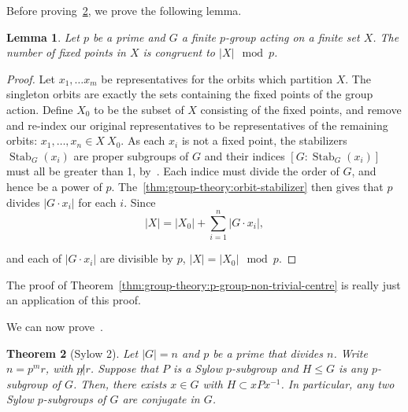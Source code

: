 \documentclass[12pt]{report}
\newenvironment{bluebox}{\begin{tcolorbox}[colback=blue!5!white,colframe=blue!75!black]}{\end{tcolorbox}}
\newcommand{\Stab}{\operatorname{Stab}}
\newtheorem{theorem}{Theorem}[section] %
\newtheorem{lemma}[theorem]{Lemma}
\theoremstyle{definition}
\newenvironment{note}{\begin{bluebox}}{\end{bluebox}}
\begin{document}
Before proving~\ref{thm:group-theory:Sylow-2}, we prove the following lemma.

\begin{lemma}\label{lem:group-theory:fixed-points-p-group-action}
  Let \(p\) be a prime and \(G\) a finite \(p\)-group acting on a finite set \(X\). The number of fixed points in \(X\) is congruent to \(|X| \mod p\).
\end{lemma}

\begin{proof}
  Let \(x_{1}, \ldots x_{m}\) be representatives for the orbits which partition \(X\). The singleton orbits are exactly the sets containing the fixed points of the group action. Define \(X_{0}\) to be the subset of \(X\) consisting of the fixed points, and remove and re-index our original representatives to be representatives of the remaining orbits: \(x_{1}, \ldots, x_{n} \in X \ X_{0}\). As each \(x_{i}\) is not a fixed point, the stabilizers \(\Stab_{G}(x_{i})\) are proper subgroups of \(G\) and their indices \([G : \Stab_{G}(x_{i})]\) must all be greater than 1, by~. Each indice must divide the order of \(G\), and hence be a power of \(p\). The~\ref{thm:group-theory:orbit-stabilizer} then gives that \(p\) divides \(|G \cdot x_{i}|\) for each \(i\). Since
  \[|X| = |X_{0}| + \sum_{i=1}^{n} |G \cdot x_{i}|,\]

  and each of \(|G \cdot x_{i}|\) are divisible by \(p\), \(|X| = |X_{0}| \mod p\).
\end{proof}

\begin{note}
  The proof of Theorem~\ref{thm:group-theory:p-group-non-trivial-centre} is really just an application of this proof.
\end{note}

We can now prove~.

\begin{theorem}[Sylow 2]\label{thm:group-theory:Sylow-2}
  Let \(|G| = n\) and \(p\) be a prime that divides \(n\). Write \(n = p^{m}r\), with \(p \not| r\). Suppose that \(P\) is a Sylow \(p\)-subgroup and \(H \leq G\) is any \(p\)-subgroup of \(G\). Then, there exists \(x \in G\) with \(H \subset xPx^{-1}\). In particular, any two Sylow \(p\)-subgroups of \(G\) are conjugate in \(G\).
\end{theorem}
\end{document}

